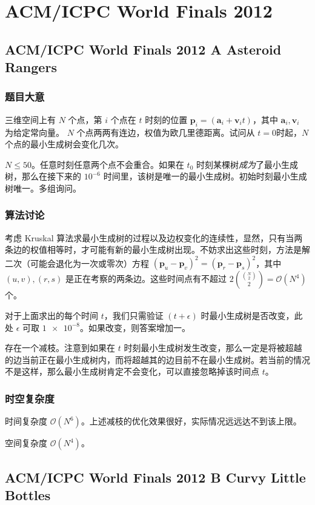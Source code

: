 
	\section{ACM/ICPC World Finals 2012}
		\subsection{ACM/ICPC World Finals 2012 A Asteroid Rangers}
			\subsubsection{题目大意}
				三维空间上有 $N$ 个点，第 $i$ 个点在 $t$ 时刻的位置 $\mathbf{p}_i = (\mathbf{a}_i + \mathbf{v}_i t)$，其中 $\mathbf{a}_i,\mathbf{v}_i$ 为给定常向量。
				$N$ 个点两两有连边，权值为欧几里德距离。试问从 $t = 0 $时起，$N$ 个点的最小生成树会变化几次。
			
				$N \le 50$。任意时刻任意两个点不会重合。如果在 $t_0$ 时刻某棵树\emph{成为}了最小生成树，那么在接下来的 $10^{-6}$ 时间里，该树是唯一的最小生成树。初始时刻最小生成树唯一。多组询问。
			\subsubsection{算法讨论}
				考虑 Kruskal 算法求最小生成树的过程以及边权变化的连续性，显然，只有当两条边的权值相等时，才可能有新的最小生成树出现。不妨求出这些时刻，方法是解二次（可能会退化为一次或零次）方程 $\left(\mathbf{p}_u - \mathbf{p}_v\right)^2 = \left(\mathbf{p}_r - \mathbf{p}_s\right)^2$，其中 $(u,v),(r,s)$ 是正在考察的两条边。这些时间点有不超过 $2\binom{\binom{N}{2}}{2} = \mathcal{O}\left(N^4\right)$ 个。
				
				对于上面求出的每个时间 $t$，我们只需验证 $(t + \epsilon)$ 时最小生成树是否改变，此处 $\epsilon$ 可取 $\num{1e-8}$。如果改变，则答案增加一。
				
				存在一个减枝。注意到如果在 $t$ 时刻最小生成树发生改变，那么一定是将被超越的边当前正在最小生成树内，而将超越其的边目前不在最小生成树。若当前的情况不是这样，那么最小生成树肯定不会变化，可以直接忽略掉该时间点 $t$。
			\subsubsection{时空复杂度}
				时间复杂度 $\mathcal{O}\left(N^6\right)$。上述减枝的优化效果很好，实际情况远远达不到该上限。
					
				空间复杂度 $\mathcal{O}\left(N^4\right)$。
		\newpage
		\subsection{ACM/ICPC World Finals 2012 B Curvy Little Bottles}
